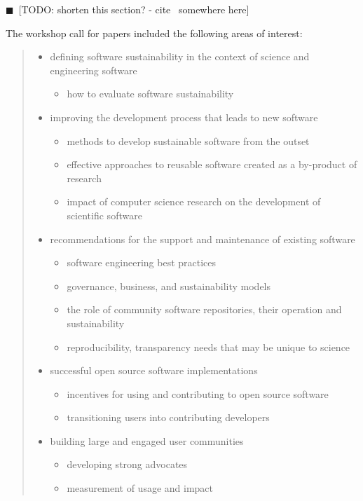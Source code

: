 \documentclass[11pt, oneside]{amsart}
\newcommand{\todo}[1]{{\color{blue}$\blacksquare$~\textsf{[TODO: #1]}}}
\begin{document}
\todo{shorten this section? - cite~\cite{WSSSPE2-pre-report} somewhere here}

The workshop call for papers included the following areas of interest:
\begin{quote}
\begin{itemize}

\item defining software sustainability in the context of science and engineering software
\begin{itemize}
\item how to evaluate software sustainability
\end{itemize}

\item improving the development process that leads to new software
\begin{itemize}
\item methods to develop sustainable software from the outset
\item effective approaches to reusable software created as a by-product of research
\item impact of computer science research on the development of scientific software
\end{itemize}

\item recommendations for the support and maintenance of existing software
\begin{itemize}
\item software engineering best practices
\item governance, business, and sustainability models
\item the role of community software repositories, their operation and sustainability
\item reproducibility, transparency needs that may be unique to science
\end{itemize}

\item successful open source software implementations
\begin{itemize}
\item incentives for using and contributing to open source software
\item transitioning users into contributing developers
\end{itemize}

\item building large and engaged user communities
\begin{itemize}
\item developing strong advocates
\item measurement of usage and impact
\end{itemize}


\end{itemize}
\end{quote}
\end{document}
